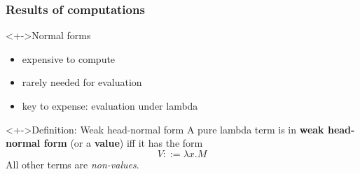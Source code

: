 \documentclass[pdftex,aspectratio=169]{beamer}
\subtitle
{Evaluation and Typing}
\begin{document}
\begin{frame}
  \titlepage
\end{frame}



\begin{frame}[fragile]
  \frametitle{Results of computations}
\begin{block}<+->{Normal forms}
  \begin{itemize}
  \item expensive to compute
  \item rarely needed for evaluation
  \item key to expense: evaluation under lambda
  \end{itemize}
\end{block}
\begin{block}<+->{Definition: Weak head-normal form}
  A pure lambda term is in \textbf{weak head-normal form} (or a \textbf{value}) iff it
  has the form  
  \begin{displaymath}
    V ::= \lambda x.M
  \end{displaymath}
  All other terms are \emph{non-values}.
\end{block}
\end{frame}             
\end{document}
